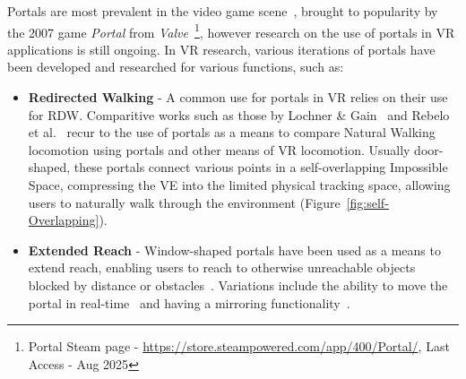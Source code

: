Portals are most prevalent in the video game scene~\cite{Murray2019}, brought to popularity by the 2007 game \textit{Portal} from 
\textit{Valve}~\footnote{Portal Steam page - \href{https://store.steampowered.com/app/400/Portal/}{https://store.steampowered.com/app/400/Portal/}, Last Access - Aug 2025 }, 
however research on the use of portals in \gls{VR} applications is still ongoing. In \gls{VR} research, various iterations of portals 
have been developed and researched for various functions, such as:

\begin{itemize}
    \item \textbf{Redirected Walking} - A common use for portals in \gls{VR} relies on their use for \gls{RDW}. 
    Comparitive works such as those by Lochner \& Gain~\cite{Lochner2021} 
    and Rebelo et al.~\cite{Rebelo2024b} recur to the use of portals as a means to compare Natural Walking locomotion using portals and 
    other means of \gls{VR} locomotion.
    Usually door-shaped, these portals connect various points in a self-overlapping Impossible Space, compressing the \gls{VE} into 
    the limited physical tracking space, allowing users to naturally walk through the environment (Figure~\ref{fig:self-Overlapping}).
    
    \item \textbf{Extended Reach} - Window-shaped portals have been used as a means to extend reach, enabling users to reach to otherwise 
    unreachable objects blocked by distance or obstacles~\cite{Han2022,Ablett2024}. Variations include the ability to move the portal in real-time~\cite{Ablett2024} 
    and having a mirroring functionality~\cite{Li2021}.
    

\end{itemize}
